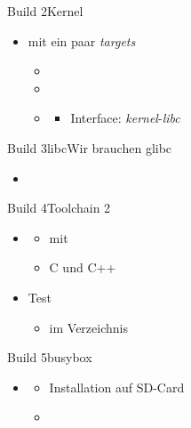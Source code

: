 \begin{frame}{Build 2}{Kernel}
 \begin{itemize} 
  \item {} mit ein paar {\em targets}
   \begin{itemize}
    \item {}
    \item {}
    \item {} 
	\begin{itemize}
	 \item Interface: {\em kernel}-{\em libc}
	\end{itemize}
   \end{itemize}
  \end{itemize}
\end{frame}

\begin{frame}{Build 3}{libc}{Wir brauchen glibc}
 \begin{itemize} 
  \item {} 
 \end{itemize}
\end{frame}

\begin{frame}{Build 4}{Toolchain 2}
 \begin{itemize} 
  \item {} 
  \begin{itemize}
   \item mit 
   \item {\Large C} und {\Large C++}
  \end{itemize}
  \item Test
  \begin{itemize}\item im Verzeichnis \end{itemize}
 \end{itemize}
\end{frame}

\begin{frame}{Build 5}{busybox}
 \begin{itemize}
  \item {}
  \begin{itemize}
   \item Installation auf SD-Card
   \item {}
  \end{itemize}
 \end{itemize}
\end{frame}


